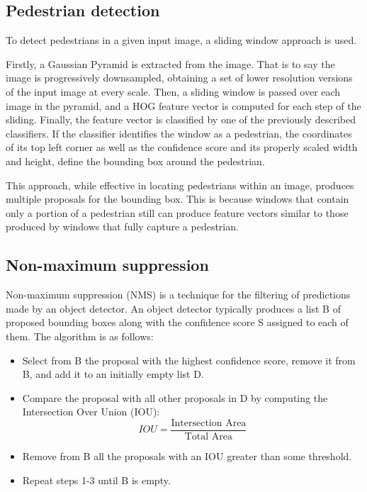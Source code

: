 \documentclass[journal,twocolumn]{IEEEtran}
\begin{document}
\subsection{Pedestrian detection}

To detect pedestrians in a given input image, a sliding window approach is used. 

Firstly, a Gaussian Pyramid is extracted
from the image. That is to say the image is progressively
downsampled, obtaining a set of lower resolution versions of the input image at every scale. Then, a sliding window is passed over each image in the
pyramid, and a HOG feature vector is computed for each step
of the sliding. Finally, the feature vector is classified by one of the
previously described classifiers. If the classifier identifies the
window as a pedestrian, the coordinates of its top left corner
as well as the confidence score and its properly scaled width
and height, define the bounding box around the pedestrian.

This approach, while effective in locating pedestrians within
an image, produces multiple proposals for the bounding box.
This is because windows that contain only a portion of a
pedestrian still can produce feature vectors similar to those produced by windows that fully capture a pedestrian.

\subsection{Non-maximum suppression}

Non-maximum suppression (NMS) is a technique for the
filtering of predictions made by an object detector. An object
detector typically produces a list B of proposed bounding
boxes along with the confidence score S assigned to each of
them. The algorithm is as follows:
\begin{itemize}
\item Select from B the proposal with the highest confidence
score, remove it from B, and add it to an initially empty
list D.
\item Compare the proposal with all other proposals in D by
computing the Intersection Over Union (IOU):
\begin{equation*}
IOU=\frac{\text{Intersection Area}}{\text{Total Area}}
\end{equation*}
\item Remove from B all the proposals with an IOU greater
than some threshold.
\item Repeat steps 1-3 until B is empty.
\end{itemize}
\end{document}
